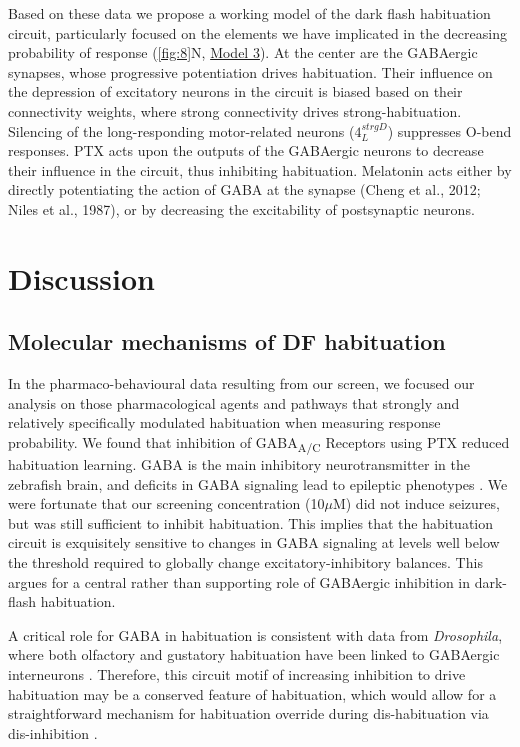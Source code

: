 \documentclass[9pt,lineno]{RandlettLab_elife}
\begin{document}
Based on these data we propose a working model of the dark flash habituation circuit, particularly focused on the elements we have implicated in the decreasing probability of response (\autoref{fig:8}N, \underline{Model 3}). At the center are the GABAergic synapses, whose progressive potentiation drives habituation. Their influence on the depression of excitatory neurons in the circuit is biased based on their connectivity weights, where strong connectivity drives strong-habituation. Silencing of the long-responding motor-related neurons ($4_{L}^{strgD}$) suppresses O-bend responses. PTX acts upon the outputs of the GABAergic neurons to decrease their influence in the circuit, thus inhibiting habituation. Melatonin acts either by directly potentiating the action of GABA at the synapse (Cheng et al., 2012; Niles et al., 1987), or by decreasing the excitability of postsynaptic neurons. 

\section{Discussion}
\subsection{Molecular mechanisms of DF habituation}

In the pharmaco-behavioural data resulting from our screen, we focused our analysis on those pharmacological agents and pathways that strongly and relatively specifically modulated habituation when measuring response probability. We found that inhibition of GABA\textsubscript{A/C} Receptors using PTX reduced habituation learning. GABA is the main inhibitory neurotransmitter in the zebrafish brain, and deficits in GABA signaling lead to epileptic phenotypes \cite{Baraban2005-xq}. We were fortunate that our screening concentration (10$\mu$M) did not induce seizures, but was still sufficient to inhibit habituation. This implies that the habituation circuit is exquisitely sensitive to changes in GABA signaling at levels well below the threshold required to globally change excitatory-inhibitory balances. This argues for a central rather than supporting role of GABAergic inhibition in dark-flash habituation. 

A critical role for GABA in habituation is consistent with data from \emph{Drosophila}, where both olfactory and gustatory habituation have been linked to GABAergic interneurons \cite{Das2011-gd, Paranjpe2012-ce,Trisal2022-pa}. Therefore, this circuit motif of increasing inhibition to drive habituation may be a conserved feature of habituation, which would allow for a straightforward mechanism for habituation override during dis-habituation via dis-inhibition \cite{Cooke2020-mz, Trisal2022-pa}. 
\end{document}
